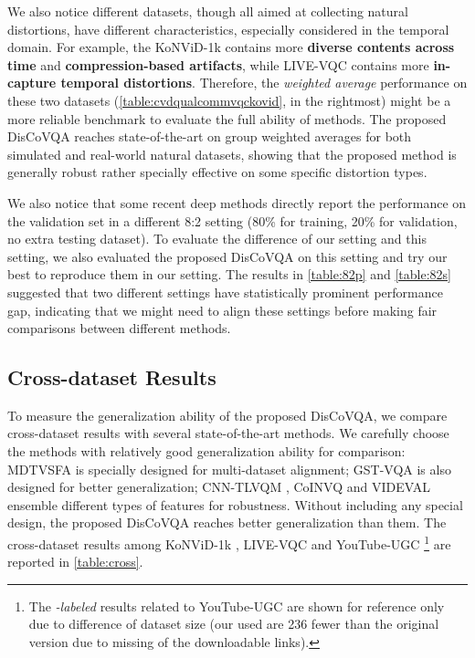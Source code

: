 \documentclass[journal]{IEEEtran}
\begin{document}
We also notice different datasets, though all aimed at collecting natural distortions, have different characteristics, especially considered in the temporal domain. For example, the KoNViD-1k contains more \textbf{diverse contents across time} and \textbf{compression-based artifacts}, while LIVE-VQC contains more \textbf{in-capture temporal distortions}. Therefore, the \textit{weighted average} performance on these two datasets (\cref{table:cvdqualcommvqckovid}, in the rightmost) might be a more reliable benchmark to evaluate the full ability of methods. The proposed DisCoVQA reaches state-of-the-art on group weighted averages for both simulated and real-world natural datasets, showing that the proposed method is generally robust rather specially effective on some specific distortion types. 
 
We also notice that some recent deep methods \cite{cnntlvqm, pvq, lsctphiq} directly report the performance on the validation set in a different 8:2 setting (80\% for training, 20\% for validation, no extra testing dataset). To evaluate the difference of our setting and this setting, we also evaluated the proposed DisCoVQA on this setting and try our best to reproduce them in our setting. The results in \cref{table:82p} and \cref{table:82s} suggested that two different settings have statistically prominent performance gap, indicating that we might need to align these settings before making fair comparisons between different methods.




\subsection{Cross-dataset Results} \label{sec:inter}


To measure the generalization ability of the proposed DisCoVQA, we compare cross-dataset results with several state-of-the-art methods.  We carefully choose the methods with relatively good generalization ability for comparison: MDTVSFA \cite{mdtvsfa} is specially designed for multi-dataset alignment; GST-VQA\cite{gstvqa} is also designed for better generalization; CNN-TLVQM \cite{cnntlvqm}, CoINVQ \cite{rfugc} and VIDEVAL \cite{videval} ensemble different types of features for robustness. Without including any special design, the proposed DisCoVQA reaches better generalization than them. The cross-dataset results among KoNViD-1k \cite{kv1k}, LIVE-VQC \cite{vqc} and YouTube-UGC \cite{ytugc}\footnote{The \textit{-labeled} results related to YouTube-UGC are shown for reference only due to difference of dataset size (our used are 236 fewer than the original version due to missing of the downloadable links).} are reported in \cref{table:cross}. 
\end{document}
